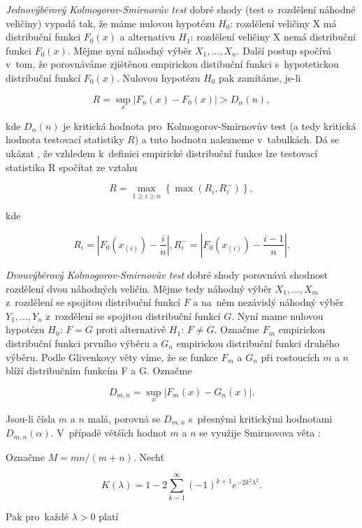 \documentclass[thesis=B,czech]{FITthesis}[2012/06/26]
\begin{document}
\textit{Jednovýběrový Kolmogorov-Smirnovův test} dobré shody (test o~rozdělení náhodné veličiny) vypadá tak, že máme nulovou hypotézu $H_{0}$: rozdělení veličiny X má distribuční funkci $F_{0}(x)$ a alternativu $H_{1}$: rozdělení veličiny X nemá distribuční funkci $F_{0}(x)$. Mějme nyní náhodný výběr $X_{1},...,X_{n}$. Další postup spočívá v~tom, že porovnáváme zjištěnou empirickou distibuční funkci s~hypotetickou distribuční funkcí $F_{0}(x)$. Nulovou hypotézu $H_{0}$ pak zamítáme, je-li

$$R=\sup_{x}\left | F_{n}(x)-F_{0}(x) \right |>D_{\alpha}(n),$$

\noindent kde $D_{\alpha}(n)$ je kritická hodnota pro~Kolmogorov-Smirnovův  test (a tedy kritická hodnota testovací statistiky $R$) a tuto hodnotu nalezneme v~tabulkách. Dá se ukázat \cite[p.134]{VŠCHT}, že vzhledem k~definici empirické distribuční funkce lze testovací statistika R spočítat ze vztahu

$$R=\max_{1\geq i\geq n}\left \{ \max\left ( R_{i}, R^{-}_{i} \right ) \right \},$$

\noindent kde 

$$R_{i}=\left | F_{0}(x_{(i)})-\frac{i}{n} \right |, R^{-}_{i}=\left | F_{0}(x_{(i)})-\frac{i-1}{n} \right |.$$

\textit{Dvouvýběrový Kolmogorov-Smirnovův test} dobré shody porovnává shodnost rozdělení dvou náhodných veličin. Mějme tedy náhodný výběr $X_{1},...,X_{m}$ z~rozdělení se spojitou distribuční funkcí $F$ a na~něm nezávislý náhodný výběr $Y_{1},...,Y_{n}$ z~rozdělení se spojitou distribuční funkcí $G$. Nyní mame nulovou hypotézu $H_{0}$: $F=G$ proti alternativě $H_{1}$: $F\neq G$. Označme $F_{m}$ empirickou distribuční funkci prvního výběru a $G_{n}$ empirickou distribuční funkci druhého výběru. Podle Glivenkovy věty \cite[Věta 11.10]{Anděl} víme, že se funkce $F_{m}$ a $G_{n}$ při rostoucích $m$ a $n$ blíží distribučním funkcím F a G. Označme

$$D_{m,n}=\sup_{x}\left | F_{m}(x)-G_{n}(x) \right |.$$

\noindent Jsou-li čísla $m$ a $n$ malá, porovná se $D_{m,n}$ s~přesnými kritickými hodnotami $D_{m,n}(\alpha)$. V~případě větších hodnot $m$ a $n$ se využije Smirnovova věta \cite[Věta 11.11]{Anděl}:

\noindent Označme $M = mn/(m+n)$. Nechť

$$K(\lambda)=1-2\sum^{\infty}_{k=1}(-1)^{k+1}e^{-2k^2\lambda^2}.$$

\noindent Pak pro~každé $\lambda>0$ platí
\end{document}
